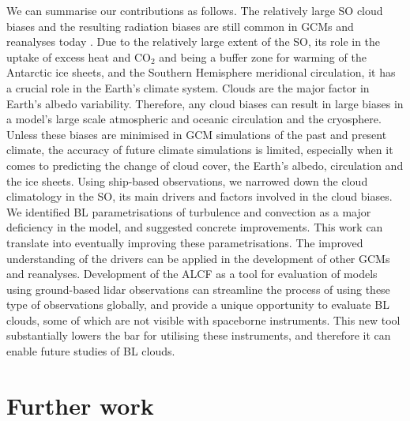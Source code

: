We can summarise our contributions as follows. The relatively large SO
cloud biases and the resulting radiation biases are still common in GCMs
and reanalyses today \citep{gettelman2020}. Due to the relatively large
extent of the SO, its role in the uptake of excess heat and CO$_2$
and being a buffer zone for warming of the Antarctic ice sheets, and the Southern Hemisphere
meridional circulation, it has a crucial role in the Earth's climate system.
Clouds are the major factor in Earth's albedo variability. Therefore, any cloud
biases can result in large biases in a model's large scale atmospheric
and oceanic circulation and the cryosphere. Unless these biases are minimised
in GCM simulations of the past and present climate, the accuracy of future climate
simulations is limited, especially when it comes to predicting the change
of cloud cover, the Earth's albedo, circulation and the ice sheets.
Using ship-based observations, we narrowed down the cloud climatology
in the SO, its main drivers and factors involved in the cloud biases. We
identified BL parametrisations of turbulence and convection as a major deficiency
in the model, and suggested concrete improvements. This work can translate into
eventually improving these parametrisations. The improved understanding of the
drivers can be applied in the development of other GCMs and reanalyses.
Development of the ALCF as a tool for evaluation of models using ground-based
lidar observations can streamline the process of using these type of observations
globally, and provide a unique opportunity to evaluate BL clouds, some of
which are not visible with spaceborne instruments. This new tool substantially
lowers the bar for utilising these instruments, and therefore it can enable
future studies of BL clouds.

\section{Further work}

